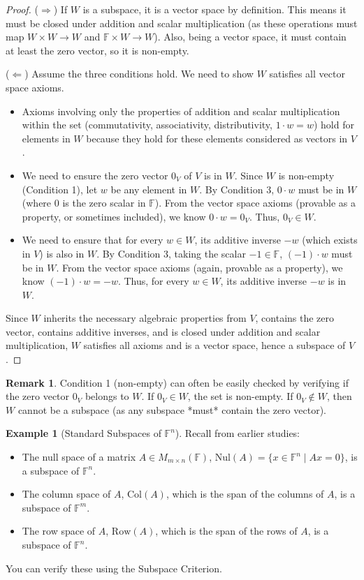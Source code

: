 \documentclass[11pt]{article}
\theoremstyle{definition}
\newtheorem{example}[theorem]{Example}
\newtheorem{remark}[theorem]{Remark}
\newcommand{\F}{\mathbb{F}}
\newcommand{\M}[2]{M_{#1 \times #2}}
\newcommand{\nul}{\text{Nul}}
\newcommand{\col}{\text{Col}}
\newcommand{\row}{\text{Row}}
\begin{document}
\begin{proof}
($\Rightarrow$) If $W$ is a subspace, it is a vector space by definition. This means it must be closed under addition and scalar multiplication (as these operations must map $W \times W \to W$ and $\F \times W \to W$). Also, being a vector space, it must contain at least the zero vector, so it is non-empty.

($\Leftarrow$) Assume the three conditions hold. We need to show $W$ satisfies all vector space axioms.
\begin{itemize}
    \item Axioms involving only the properties of addition and scalar multiplication within the set (commutativity, associativity, distributivity, $1 \cdot w = w$) hold for elements in $W$ because they hold for these elements considered as vectors in $V$.
    \item We need to ensure the zero vector $0_V$ of $V$ is in $W$. Since $W$ is non-empty (Condition 1), let $w$ be any element in $W$. By Condition 3, $0 \cdot w$ must be in $W$ (where $0$ is the zero scalar in $\F$). From the vector space axioms (provable as a property, or sometimes included), we know $0 \cdot w = 0_V$. Thus, $0_V \in W$.
    \item We need to ensure that for every $w \in W$, its additive inverse $-w$ (which exists in $V$) is also in $W$. By Condition 3, taking the scalar $-1 \in \F$, $(-1) \cdot w$ must be in $W$. From the vector space axioms (again, provable as a property), we know $(-1) \cdot w = -w$. Thus, for every $w \in W$, its additive inverse $-w$ is in $W$.
\end{itemize}
Since $W$ inherits the necessary algebraic properties from $V$, contains the zero vector, contains additive inverses, and is closed under addition and scalar multiplication, $W$ satisfies all axioms and is a vector space, hence a subspace of $V$.
\end{proof}

\begin{remark}
Condition 1 (non-empty) can often be easily checked by verifying if the zero vector $0_V$ belongs to $W$. If $0_V \in W$, the set is non-empty. If $0_V \notin W$, then $W$ cannot be a subspace (as any subspace *must* contain the zero vector).
\end{remark}

\begin{example}[Standard Subspaces of $\F^n$]
Recall from earlier studies:
\begin{itemize}
    \item The null space of a matrix $A \in \M{m}{n}(\F)$, $\nul(A) = \{ x \in \F^n \mid Ax = 0 \}$, is a subspace of $\F^n$.
    \item The column space of $A$, $\col(A)$, which is the span of the columns of $A$, is a subspace of $\F^m$.
    \item The row space of $A$, $\row(A)$, which is the span of the rows of $A$, is a subspace of $\F^n$.
\end{itemize}
You can verify these using the Subspace Criterion.
\end{example}
\end{document}
